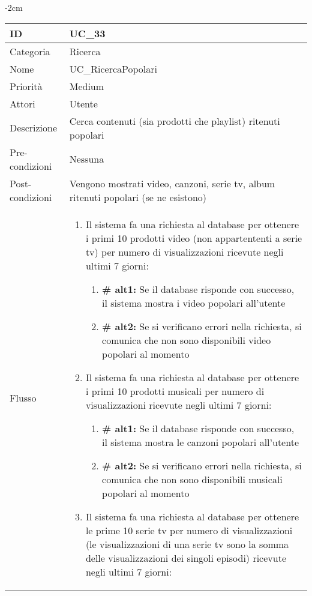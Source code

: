 \begin{center}
\begin{table}[bp]
    \centering
    \addtolength{\leftskip} {-2cm}
\begin{tabular}{ |p{2.6cm}|p{13cm}|  }
\hline
ID & UC\_33 \\\hline
Categoria & Ricerca \\\hline
Nome & UC\_RicercaPopolari\\\hline
Priorità & Medium \\\hline
Attori &  Utente \\\hline
Descrizione & Cerca contenuti (sia prodotti che playlist) ritenuti popolari\\\hline
Pre-condizioni & Nessuna\\\hline
Post-condizioni &  Vengono mostrati video, canzoni, serie tv, album ritenuti popolari (se ne esistono)\\\hline
Flusso &  	\begin{enumerate}
		\item Il sistema fa una richiesta al database per ottenere i primi 10 prodotti video (non appartententi a serie tv) per numero di visualizzazioni ricevute negli ultimi 7 giorni:
				\begin{enumerate}[label*=\arabic*.]
					\item \textbf{\# alt1:} Se il database risponde con successo, il sistema mostra i video popolari all'utente
					\item \textbf{\# alt2:} Se si verificano errori nella richiesta, si comunica che non sono disponibili video popolari al momento
				\end{enumerate}
		\item Il sistema fa una richiesta al database per ottenere i primi 10 prodotti musicali per numero di visualizzazioni ricevute negli ultimi 7 giorni:
				\begin{enumerate}[label*=\arabic*.]
					\item \textbf{\# alt1:} Se il database risponde con successo, il sistema mostra le canzoni popolari all'utente
					\item \textbf{\# alt2:} Se si verificano errori nella richiesta, si comunica che non sono disponibili musicali popolari al momento
				\end{enumerate}
		\item Il sistema fa una richiesta al database per ottenere le prime 10 serie tv per numero di visualizzazioni (le visualizzazioni di una serie tv sono la somma delle visualizzazioni dei singoli episodi) ricevute negli ultimi 7 giorni:
				\begin{enumerate}[label*=\arabic*.]

\end{enumerate}
\end{enumerate}
\end{tabular}
\end{table}
\end{center}
